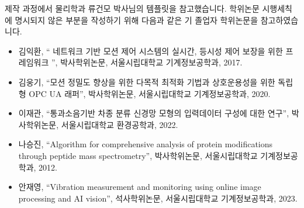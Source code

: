 
제작 과정에서 물리학과 류건모 박사님의 템플릿을 참고했습니다. 학위논문 시행세칙에 명시되지 않은 부분을 작성하기 위해 다음과 같은 기 졸업자 학위논문을 참고하였습니다.

\begin{itemize}
    \item 김익환, `` 네트워크 기반 모션 제어 시스템의 실시간, 등시성 제어 보장을 위한 프레임워크 '', 박사학위논문, 서울시립대학교 기계정보공학과, 2017.
    \item 김웅기, ``모션 정밀도 향상을 위한 다목적 최적화 기법과 상호운용성을 위한 독립형 OPC UA 래퍼'', 박사학위논문, 서울시립대학교 기계정보공학과, 2020.
    \item 이재관, ``통과소음기반 차종 분류 신경망 모형의 입력데이터 구성에 대한 연구'', 박사학위논문, 서울시립대학교 환경공학과, 2022.
    \item 나승진, ``Algorithm for comprehensive analysis of protein modifications through peptide mass spectrometry'', 박사학위논문, 서울시립대학교 기계정보공학과, 2012.
    \item 안재영, ``Vibration measurement and monitoring using online image processing and AI vision'', 석사학위논문, 서울시립대학교 기계정보공학과, 2023.
\end{itemize}
